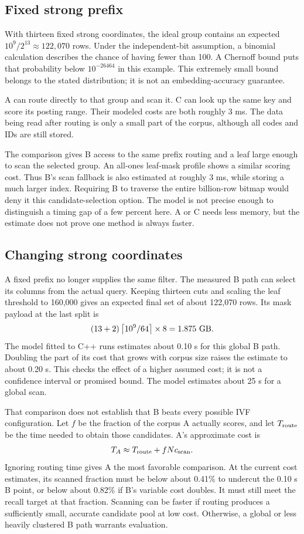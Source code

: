 \subsection{Fixed strong prefix}
With thirteen fixed strong coordinates, the ideal group contains an expected
$10^9/2^{13}\approx122{,}070$ rows. Under the independent-bit assumption, a binomial calculation
describes the chance of having fewer than 100. A Chernoff bound puts that probability below
$10^{-26464}$ in this example. This extremely small bound belongs to the stated distribution;
it is not an embedding-accuracy guarantee.

A can route directly to that group and scan it. C can look up the same key and score its posting
range. Their modeled costs are both roughly 3 ms. The data being read after routing is only a
small part of the corpus, although all codes and IDs are still stored.

The comparison gives B access to the same prefix routing and a leaf large enough
to scan the selected group. An all-ones leaf-mask profile shows a similar scoring cost. Thus
B's scan fallback is also estimated at roughly 3 ms, while storing a much larger index. Requiring B to
traverse the entire billion-row bitmap would deny it this candidate-selection option.
The model is not precise enough to distinguish a timing gap of a few percent here.
A or C needs less memory, but the estimate does not prove one method is always faster.

\subsection{Changing strong coordinates}
A fixed prefix no longer supplies the same filter. The measured B path can select its columns
from the actual query. Keeping thirteen cuts and scaling the leaf threshold to 160,000 gives
an expected final set of about 122,070 rows. Its mask payload at the last split is
\[
(13+2)\ceil{10^9/64}\times8=1.875\ \mathrm{GB}.
\]
The model fitted to C++ runs estimates about 0.10 s for this global B path. Doubling
the part of its cost that grows with corpus size raises the estimate to about 0.20 s. This
checks the effect of a higher assumed cost; it is not a confidence interval or promised
bound. The model estimates about 25 s for a global scan.

That comparison does not establish that B beats every possible IVF configuration. Let $f$ be
the fraction of the corpus A actually scores, and let $T_{\rm route}$ be the time needed to
obtain those candidates. A's approximate cost is
\[
T_A\approx T_{\rm route}+fN c_{\rm scan}.
\]
Ignoring routing time gives A the most favorable comparison. At the current cost estimates, its
scanned fraction must be below about 0.41\% to undercut the 0.10 s B point, or below about
0.82\% if B's variable cost doubles. It must still meet the recall target at that fraction.
Scanning can be faster if routing produces a sufficiently small, accurate candidate pool at low cost.
Otherwise, a global or less heavily clustered B path warrants evaluation.

